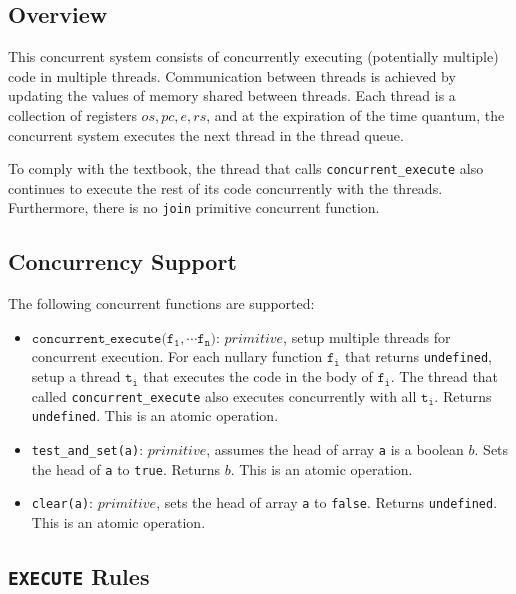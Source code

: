 \subsection{Overview}
\label{sec:org469dfa8}
This concurrent system consists of concurrently executing (potentially multiple) code in multiple threads. Communication between threads is achieved by updating the values of memory shared between threads. Each thread is a collection of registers \(\textit{os}, \textit{pc}, \textit{e}, \textit{rs}\), and at the expiration of the time quantum, the concurrent system executes the next thread in the thread queue.

To comply with the textbook, the thread that calls \texttt{concurrent\_execute} also continues to execute the rest of its code concurrently with the threads. Furthermore, there is no \texttt{join} primitive concurrent function.

\subsection{Concurrency Support}
\label{sec:orgbb5bb34}
The following concurrent functions are supported:
\begin{itemize}
\item \(\texttt{concurrent_execute(}\texttt{f}_\texttt{1}, \cdots \texttt{f}_\texttt{n}\texttt{)}\): \(\textit{primitive}\), setup multiple threads for concurrent execution. For each nullary function \(\texttt{f}_\texttt{i}\) that returns \texttt{undefined}, setup a thread \(\texttt{t}_\texttt{i}\) that executes the code in the body of \(\texttt{f}_\texttt{i}\). The thread that called \texttt{concurrent\_execute} also executes concurrently with all \(\texttt{t}_\texttt{i}\). Returns \texttt{undefined}. This is an atomic operation.
\item \texttt{test\_and\_set(a)}: \(\textit{primitive}\), assumes the head of array \texttt{a} is a boolean \(b\). Sets the head of \texttt{a} to \texttt{true}. Returns \(b\). This is an atomic operation.
\item \texttt{clear(a)}: \(\textit{primitive}\), sets the head of array \texttt{a} to \texttt{false}. Returns \texttt{undefined}. This is an atomic operation.
\end{itemize}

\subsection{\texttt{EXECUTE} Rules}
\label{sec:orge0bf09d}

